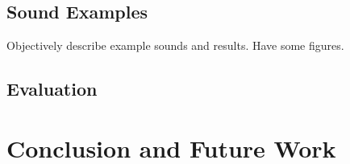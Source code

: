 \documentclass{acmsiggraph}               %
\begin{document}

\subsection{Sound Examples}
Objectively describe example sounds and results. Have some figures. 

\subsection{Evaluation}





\section{Conclusion and Future Work}
\end{document}
